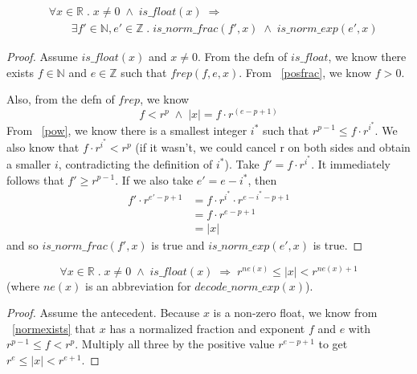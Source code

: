 \documentclass{article}
\begin{document}
\begin{thm}
\label{normexists}
\begin{align*}
&\forall x \in \mathbb{R} \; . \; x \neq 0 \; \wedge \; is\_float(x) \; 
\Longrightarrow \\
& \qquad \exists f' \in \mathbb{N}, e' \in \mathbb{Z} \; . \; 
is\_norm\_frac(f', x) \; \wedge \; is\_norm\_exp(e', x)
\end{align*}
\begin{proof} Assume $is\_float(x)$ and $x \neq 0$. From the defn of
$is\_float$, we know there exists $f \in \mathbb{N}$ and $e \in \mathbb{Z}$
such that $frep(f, e, x)$. From ~\ref{posfrac}, we know $f > 0$.

Also, from the defn of $frep$, we know
\begin{equation*}
f < r^p \; \wedge \; |x| = f \cdot r^{(e - p + 1)}
\end{equation*}
From ~\ref{pow}, we know there is a smallest integer $i^*$ such that
$r^{p - 1} \leq f \cdot r^{i^*}$. We also know that $f \cdot r^{i^*} < r^p$
(if it wasn't, we could cancel r on both sides and obtain a smaller
$i$, contradicting the definition of $i^*$). Take $f' = f \cdot r^{i^*}$.
It immediately follows that $f' \geq r^{p - 1}$. If we also take
$e' = e - i^*$, then
\begin{align*}
f' \cdot r^{e' - p + 1} &= f \cdot r^{i^*} \cdot r^{e - i^* - p + 1}\\
&= f \cdot r^{e - p + 1}\\
&= |x|
\end{align*}
and so $is\_norm\_frac(f', x)$ is true and $is\_norm\_exp(e', x)$ is true.
\end{proof}
\end{thm}

\begin{lem}
\label{normbound}
\begin{equation*}
\forall x \in \mathbb{R} \; . \; x \neq 0 \; \wedge \; is\_float(x) \;
\Longrightarrow \; r^{ne(x)} \leq |x| < r^{ne(x) + 1}
\end{equation*}
(where $ne(x)$ is an abbreviation for $decode\_norm\_exp(x)$).
\begin{proof} Assume the antecedent. Because $x$ is a non-zero float, we
know from ~\ref{normexists} that $x$ has a normalized fraction and exponent
$f$ and $e$ with $r^{p - 1} \leq f < r^p$. Multiply all three by the positive
value $r^{e - p + 1}$ to get $r^e \leq |x| < r^{e + 1}$.
\end{proof}
\end{lem}
\end{document}

